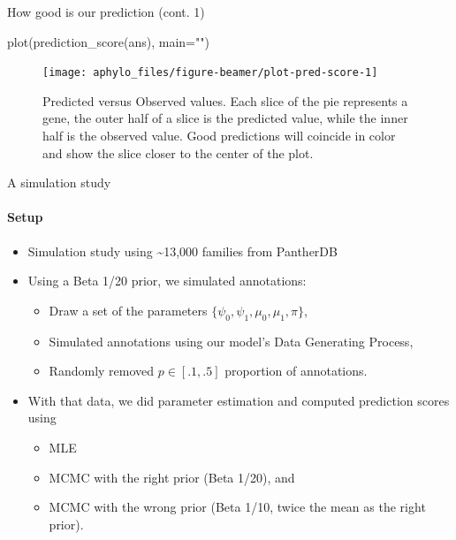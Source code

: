 \documentclass[9pt,handout,ignorenonframetext,]{beamer}
\newenvironment{Shaded}{\begin{snugshade}}{\end{snugshade}}
\newcommand{\KeywordTok}[1]{\textcolor[rgb]{0.94,0.87,0.69}{#1}}
\newcommand{\DataTypeTok}[1]{\textcolor[rgb]{0.87,0.87,0.75}{#1}}
\newcommand{\StringTok}[1]{\textcolor[rgb]{0.80,0.58,0.58}{#1}}
\newcommand{\NormalTok}[1]{\textcolor[rgb]{0.80,0.80,0.80}{#1}}
\providecommand{\tightlist}{%
  \setlength{\itemsep}{0pt}\setlength{\parskip}{0pt}}
\begin{document}
\begin{frame}[fragile,t]{How good is our prediction (cont. 1)}

\footnotesize

\begin{Shaded}
\begin{Highlighting}[]
\KeywordTok{plot}\NormalTok{(}\KeywordTok{prediction_score}\NormalTok{(ans), }\DataTypeTok{main=}\StringTok{""}\NormalTok{)}
\end{Highlighting}
\end{Shaded}

\begin{figure}

{\centering \texttt{[image: aphylo\_files/figure-beamer/plot-pred-score-1]} 

}

\caption{Predicted versus Observed values. Each slice of the pie represents a gene, the outer half of a slice is the predicted value, while the inner half is the observed value. Good predictions will coincide in color and show the slice closer to the center of the plot.}\label{fig:plot-pred-score}
\end{figure}

\normalsize

\end{frame}

\begin{frame}[t,label=sim-setup]{A simulation study}

\framesubtitle{Setup}

\begin{itemize}
\item
  Simulation study using \textasciitilde{}13,000 families from PantherDB
\item
  Using a Beta 1/20 prior, we simulated annotations:

  \begin{itemize}
  \item
    Draw a set of the parameters
    \(\{\psi_0,\psi_1 ,\mu_0, \mu_1,\pi\}\),
  \item
    Simulated annotations using our model's Data Generating Process,
  \item
    Randomly removed \(p\in [.1, .5]\) proportion of annotations.
  \end{itemize}
\item
  With that data, we did parameter estimation and computed prediction
  scores using

  \begin{itemize}
  \tightlist
  \item
    MLE
  \item
    MCMC with the right prior (Beta 1/20), and
  \item
    MCMC with the wrong prior (Beta 1/10, twice the mean as the right
    prior).
  \end{itemize}
\end{itemize}

\hyperlink{sim-convergence}{}

\end{frame}
\end{document}
